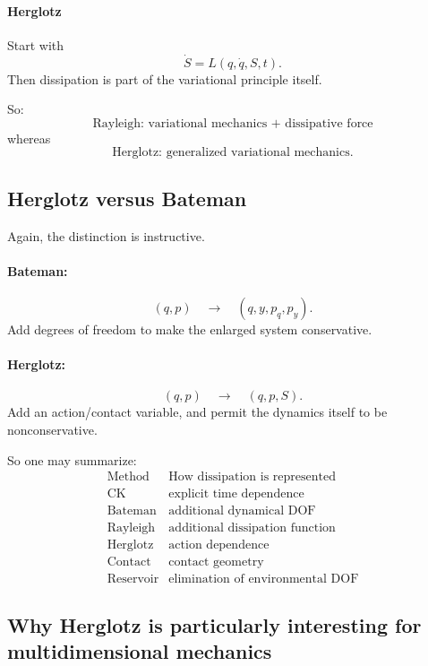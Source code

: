 \paragraph{Herglotz}
Start with $$ \dot S=L(q,\dot q,S,t). $$
Then dissipation is part of the variational principle itself.

So:
$$ \boxed{ \text{Rayleigh: variational mechanics + dissipative force} } $$
whereas
$$ \boxed{ \text{Herglotz: generalized variational mechanics}. } $$

\subsection{Herglotz versus Bateman}

Again, the distinction is instructive.

\paragraph{Bateman:}
$$ (q,p)\quad\rightarrow\quad(q,y,p_q,p_y). $$
Add degrees of freedom to make the enlarged system conservative.

\paragraph{Herglotz:}
$$ (q,p)\quad\rightarrow\quad(q,p,S). $$
Add an action/contact variable, and permit the dynamics itself to be nonconservative.

So one may summarize:
$$ \boxed{ 
\begin{array}{c|c} \text{Method}&\text{How dissipation is represented}\\ 
    \hline 
    \text{CK}&\text{explicit time dependence}\\ 
    \text{Bateman}&\text{additional dynamical DOF}\\ 
    \text{Rayleigh}&\text{additional dissipation function}\\ 
    \text{Herglotz}&\text{action dependence}\\ 
\text{Contact}&\text{contact geometry}\\ 
\text{Reservoir}&\text{elimination of environmental DOF} 
\end{array}} $$

\subsection{Why Herglotz is particularly interesting for multidimensional mechanics}

